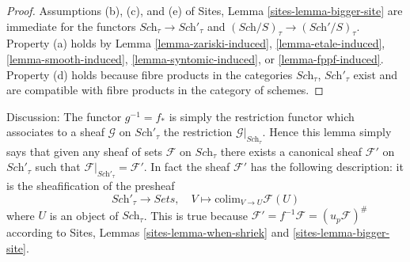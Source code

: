 \begin{proof}
Assumptions (b), (c), and (e) of
Sites, Lemma \ref{sites-lemma-bigger-site}
are immediate for the functors
$\textit{Sch}_\tau \to \textit{Sch}'_\tau$ and
$(\textit{Sch}/S)_\tau \to (\textit{Sch}'/S)_\tau$. Property (a) holds by
Lemma \ref{lemma-zariski-induced},
\ref{lemma-etale-induced},
\ref{lemma-smooth-induced},
\ref{lemma-syntomic-induced}, or
\ref{lemma-fppf-induced}.
Property (d) holds because
fibre products in the categories $\textit{Sch}_\tau$, $\textit{Sch}'_\tau$
exist and are compatible with fibre products in the category of schemes.
\end{proof}

\noindent
Discussion:
The functor $g^{-1} = f_*$ is simply the restriction functor which associates
to a sheaf $\mathcal{G}$ on $\textit{Sch}'_\tau$ the restriction
$\mathcal{G}|_{\textit{Sch}_\tau}$. Hence this lemma simply says that given
any sheaf of sets $\mathcal{F}$ on $\textit{Sch}_\tau$ there exists a
canonical sheaf $\mathcal{F}'$ on $\textit{Sch}'_\tau$ such that
$\mathcal{F}|_{\textit{Sch}'_\tau} = \mathcal{F}'$. In fact the sheaf
$\mathcal{F}'$ has the following description: it is the sheafification
of the presheaf
$$
\textit{Sch}'_\tau \longrightarrow \textit{Sets}, \quad
V \longmapsto \text{colim}_{V \to U} \mathcal{F}(U)
$$
where $U$ is an object of $\textit{Sch}_\tau$. This is true because
$\mathcal{F}' = f^{-1}\mathcal{F} = (u_p\mathcal{F})^\#$ according to
Sites, Lemmas \ref{sites-lemma-when-shriek} and \ref{sites-lemma-bigger-site}.









